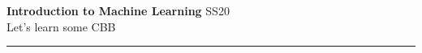 \documentclass[11pt,landscape,a4paper]{extarticle}
\begin{document}
\begin{multicols*}{4}

\noindent\large{\textbf{Introduction to Machine Learning} SS20} \\
\normalsize{Let's learn some CBB\hspace{0.5cm}}\vspace{0.1cm}\hrule
















\end{multicols*}
\end{document}

